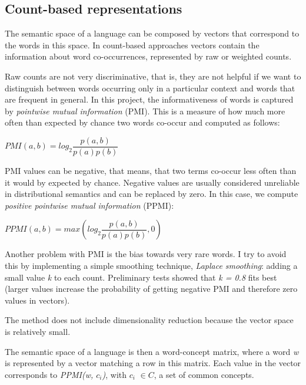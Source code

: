 \documentclass[a4paper]{article}
\begin{document}
\subsection{Count-based representations}
The semantic space of a language can be composed by vectors that correspond to the words in this space. In count-based approaches vectors contain the information about word co-occurrences, represented by raw  or weighted counts\cite{j}.\par
Raw counts are not very discriminative, that is, they are not helpful if we want to distinguish between words occurring only in a particular context and words that are frequent in general\cite{j}. In this project, the informativeness of words is captured by \textit{pointwise mutual information} (PMI). This is a measure of how much more often than expected by chance two words co-occur and computed as follows:
\begin{center}
$PMI(a,b) = log_2\dfrac{p(a,b)}{p(a)p(b)}$
\end{center}
PMI values can be negative, that means, that two terms co-occur less often than it would by expected by chance. Negative values are usually considered unreliable in distributional semantics\cite{j} and can be replaced by zero. In this case, we compute \textit{positive pointwise mutual information} (PPMI):
 \begin{center}
$PPMI(a,b) = max(log_2\dfrac{p(a,b)}{p(a)p(b)},0)$
\end{center}
Another problem with PMI is the bias towards very rare words\cite{j}. I try to avoid this by implementing a simple smoothing technique, \textit{Laplace smoothing}: adding a small value \textit{k} to each count. Preliminary tests showed that \textit{k = 0.8} fits best (larger values increase the probability of getting negative PMI and therefore zero values in vectors). \par
The method does not include dimensionality reduction because the vector space is relatively small. \par
The semantic space of a language is then a word-concept matrix, where a word \textit{w} is represented by a vector matching a row in this matrix. Each value in the vector corresponds to \textit{PPMI(w, $c_i$)}, with  $c_i$ $\in C$, a set of common concepts.
\end{document}
